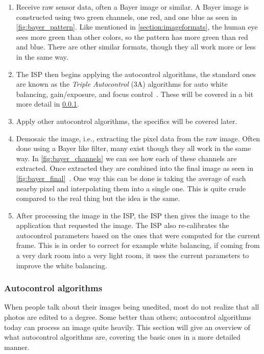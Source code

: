 \begin{enumerate}
    \item Receive raw sensor data, often a Bayer image or similar. A Bayer
        image is constructed using two green channels, one red, and one blue as
        seen in \cref{fig:bayer_pattern}. Like mentioned in \cref{section:imageformats},
        the human eye sees more green than other colors, so the pattern has
        more green than red and blue. There are other similar formats, though
        they all work more or less in the same way.

    \item The ISP then begins applying the autocontrol algorithms, the standard
        ones are known as the \textit{Triple Autocontrol} (3A) algorithms for
        auto white balancing, gain/exposure, and focus control~\cite{libcameraStack}.
        These will be covered in a bit more detail in
        \cref{section:autocontrol}.

    \item Apply other autocontrol algorithms, the specifics will be covered later.

    \item Demosaic the image, i.e., extracting the pixel data from the raw
        image. Often done using a Bayer like filter, many exist though
        they all work in the same way. In \cref{fig:bayer_channels} we can see
        how each of these channels are extracted. Once extracted they are
        combined into the final image as seen in \cref{fig:bayer_final}~\cite{li2008image, libcameraStack}. One
        way this can be done is taking the average of each nearby pixel and
        interpolating them into a single one. This is quite crude compared to
        the real thing but the idea is the same.

    \item After processing the image in the ISP, the ISP then gives the image
        to the application that requested the image. The ISP also re-calibrates
        the autocontrol parameters based on the ones that were computed for the
        current frame. This is in order to correct for example white balancing,
        if coming from a very dark room into a very light room, it uses the
        current parameters to improve the white balancing.

\end{enumerate}

\subsubsection{Autocontrol algorithms} \label{section:autocontrol}
When people talk about their images being unedited, most do not realize that all
photos are edited to a degree. Some better than others; autocontrol algorithms
today can process an image quite heavily. This section will give an overview of
what autocontrol algorithms are, covering the basic ones in a more detailed
manner.

